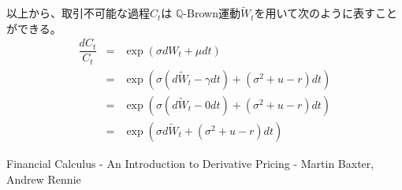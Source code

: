 \documentclass[uplatex,a4j,12pt,dvipdfmx]{jsarticle}
\begin{document}
以上から、取引不可能な過程$C_{t}$は
$\mathbb{Q}$-Brown運動$\tilde{W}_{t}$を用いて次のように表すことができる。
%
%
\begin{eqnarray*}
	\dfrac{dC_{t}}{C_{t}}
	&=&
	\exp \left( \sigma dW_{t} + \mu dt \right)
	\\ &=&
	\exp \left( \sigma ( d \tilde{W}_{t} - \gamma d t) + (\sigma^{2} + u - r) dt \right)
	\\ &=&
	\exp \left( \sigma (d \tilde{W}_{t} - 0 d t) + (\sigma^{2} + u - r) dt \right)
	\\ &=&
	\exp \left( \sigma d \tilde{W}_{t} + (\sigma^{2} + u - r) dt \right)
\end{eqnarray*}
%
%

\begin{thebibliography}{9}
	Financial Calculus - An Introduction to Derivative Pricing - Martin Baxter, Andrew Rennie
\end{thebibliography}
\end{document}
